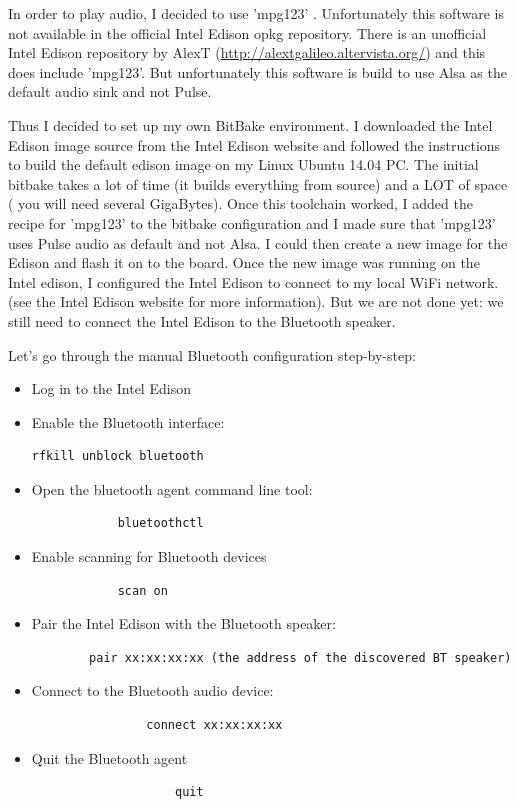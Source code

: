 \documentclass[12pt,a4paper]{scrreprt}
\begin{document}
In order to play  audio, I decided to use 'mpg123' . Unfortunately this software is not available in the official Intel Edison opkg repository. There is an unofficial Intel Edison repository by AlexT (\url{http://alextgalileo.altervista.org/}) and this does include 'mpg123'. But unfortunately this software is build to use Alsa as the default audio sink and not Pulse. 

Thus I decided to set up my own BitBake environment. 
I downloaded the Intel Edison image source from the Intel Edison website and followed the instructions to build the default edison image on my Linux Ubuntu 14.04 PC. 
The initial bitbake takes a lot of time (it builds everything from source) and a LOT of space ( you will need several GigaBytes). 
Once this toolchain worked, I added the recipe for 'mpg123' to the bitbake configuration and I made sure that 'mpg123' uses Pulse audio as default and not Alsa. I could then create a new image for the Edison and flash it on to the board. Once the new image was running on the Intel edison, I configured the Intel Edison to connect to my local WiFi network.(see the Intel Edison website for more information). But we are not done yet: we still need to connect the Intel Edison to the Bluetooth speaker.

Let's go through the manual Bluetooth configuration step-by-step:

\begin{itemize}
	\item Log in to the Intel Edison
	\item Enable the Bluetooth interface: 
	\begin{verbatim}
rfkill unblock bluetooth
	\end{verbatim}
		\item Open the bluetooth agent command line tool:
			\begin{verbatim}
			bluetoothctl
			\end{verbatim}
			\item Enable scanning for Bluetooth devices
			\begin{verbatim}
			scan on
			\end{verbatim}
			\item Pair the Intel Edison with the Bluetooth speaker:
			\begin{verbatim}
		pair xx:xx:xx:xx (the address of the discovered BT speaker)
			\end{verbatim}
				\item Connect to the Bluetooth audio device:
				\begin{verbatim}
				connect xx:xx:xx:xx 
				\end{verbatim}
					\item Quit the Bluetooth agent
					\begin{verbatim}
					quit
					\end{verbatim}	
\end{itemize}
\end{document}
